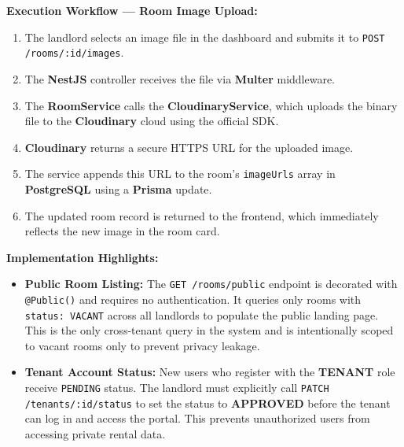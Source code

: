 \textbf{Execution Workflow — Room Image Upload:}
\begin{enumerate}
    \item The landlord selects an image file in the dashboard and submits it to \texttt{POST /rooms/:id/images}.
    \item The \textbf{NestJS} controller receives the file via \textbf{Multer} middleware.
    \item The \textbf{RoomService} calls the \textbf{CloudinaryService}, which uploads the binary file to the \textbf{Cloudinary} cloud using the official SDK.
    \item \textbf{Cloudinary} returns a secure HTTPS URL for the uploaded image.
    \item The service appends this URL to the room's \texttt{imageUrls} array in \textbf{PostgreSQL} using a \textbf{Prisma} update.
    \item The updated room record is returned to the frontend, which immediately reflects the new image in the room card.
\end{enumerate}

\textbf{Implementation Highlights:}
\begin{itemize}
    \item \textbf{Public Room Listing:} The \texttt{GET /rooms/public} endpoint is decorated with \texttt{@Public()} and requires no authentication. It queries only rooms with \texttt{status: VACANT} across all landlords to populate the public landing page. This is the only cross-tenant query in the system and is intentionally scoped to vacant rooms only to prevent privacy leakage.
    \item \textbf{Tenant Account Status:} New users who register with the \textbf{TENANT} role receive \texttt{PENDING} status. The landlord must explicitly call \texttt{PATCH /tenants/:id/status} to set the status to \textbf{APPROVED} before the tenant can log in and access the portal. This prevents unauthorized users from accessing private rental data.
\end{itemize}

